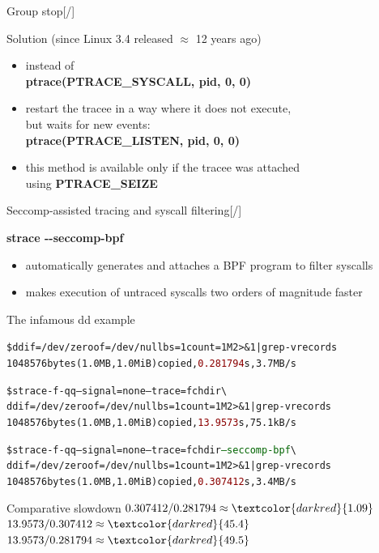 \documentclass[unicode,aspectratio=169,xcolor={table,dvipsnames,usenames}]{beamer}
\begin{document}
\begin{frame}{\Large Group stop\hfill [\insertframenumber/\inserttotalframenumber]}
\Large
\begin{block}{Solution (since Linux 3.4 released $\approx$ 12 years ago)}
\begin{itemize}
	\item instead of \\
		\textbf{ptrace(PTRACE\_SYSCALL, pid, 0, 0)}
	\item restart the tracee in a way where it does not execute, \\
		but waits for new events: \\
		\textbf{ptrace(PTRACE\_LISTEN, pid, 0, 0)}
	\item this method is available only if the tracee was attached \\
		using \textbf{PTRACE\_SEIZE}
\end{itemize}
\end{block}
\end{frame}

\begin{frame}[fragile]{\Large Seccomp-assisted tracing and syscall filtering\hfill [\insertframenumber/\inserttotalframenumber]}
\begin{block}{\textbf{strace -{}-seccomp-bpf}}
\small
\begin{itemize}
	\item automatically generates and attaches a BPF program to filter syscalls
	\item makes execution of untraced syscalls two orders of magnitude faster
\end{itemize}
\end{block}

\begin{block}{The infamous dd example}
\scriptsize
\begin{alltt}
\$ dd if=/dev/zero of=/dev/null bs=1 count=1M 2>\&1 | grep -v records
1048576 bytes (1.0 MB, 1.0 MiB) copied, \textcolor{darkred}{0.281794} s, 3.7 MB/s

\$ strace -f -qq --signal=none --trace=fchdir \textbackslash
  dd if=/dev/zero of=/dev/null bs=1 count=1M 2>\&1 | grep -v records
1048576 bytes (1.0 MB, 1.0 MiB) copied, \textcolor{darkred}{13.9573} s, 75.1 kB/s

\$ strace -f -qq --signal=none --trace=fchdir \textcolor{darkgreen}{--seccomp-bpf} \textbackslash
  dd if=/dev/zero of=/dev/null bs=1 count=1M 2>\&1 | grep -v records
1048576 bytes (1.0 MB, 1.0 MiB) copied, \textcolor{darkred}{0.307412} s, 3.4 MB/s
\end{alltt}
\end{block}

\begin{block}{Comparative slowdown}
$0.307412 / 0.281794 \approx \textcolor{darkred}{1.09}$ \hfill
$13.9573 / 0.307412 \approx \textcolor{darkred}{45.4}$ \hfill
$13.9573 / 0.281794 \approx \textcolor{darkred}{49.5}$
\end{block}
\end{frame}
\end{document}
